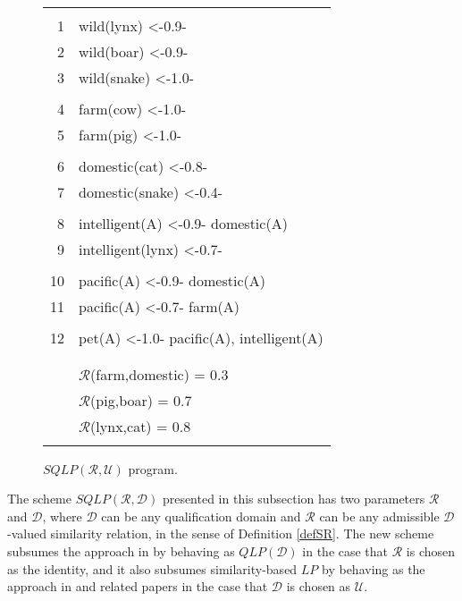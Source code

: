 \documentclass{sigplanconf}
\newcommand{\qdom}{\mathcal{D}} \newcommand{\dqdom}{D \setminus \{\bot\}} \newcommand{\bqdom}{(D \setminus \{\bot\}) \uplus \{?\}}
\newcommand{\U}{\mathcal{U}}
\newcommand{\simrel}{\mathcal{R}}
\newcommand{\qlp}[1]{QLP({#1})} \newcommand{\slp}[2]{SLP({#1,#2})} \newcommand{\sqlp}[2]{SQLP({#1,#2})} \newcommand{\bqlp}[1]{BQLP({#1})} \newcommand{\clp}[1]{CLP({#1})}
\theoremstyle{definition}
\theoremstyle{plain}
\begin{document}
\begin{figure}
\begin{center}
\tt
\begin{tabular}{|r@{\hspace{0.2cm}}l|}
\hline
&\\
\scriptsize 1 & wild(lynx) <-0.9- \\
\scriptsize 2 & wild(boar) <-0.9- \\
\scriptsize 3 & wild(snake) <-1.0- \\
&\\
\scriptsize 4 & farm(cow) <-1.0- \\
\scriptsize 5 & farm(pig) <-1.0- \\
&\\
\scriptsize 6 & domestic(cat) <-0.8- \\
\scriptsize 7 & domestic(snake) <-0.4- \\
&\\
\scriptsize 8 & intelligent(A) <-0.9- domestic(A) \\
\scriptsize 9 & intelligent(lynx) <-0.7- \\
&\\
\scriptsize 10 & pacific(A) <-0.9- domestic(A) \\
\scriptsize 11 & pacific(A) <-0.7- farm(A) \\
&\\
\scriptsize 12 & pet(A) <-1.0- pacific(A), intelligent(A) \\
&\\
\hline
&\\
&$\simrel$(farm,domestic) = 0.3 \\
&$\simrel$(pig,boar) = 0.7 \\
&$\simrel$(lynx,cat) = 0.8 \\
&\\
\hline
\end{tabular}
\end{center}
\caption{$\sqlp{\simrel}{\U}$ program.\label{fig:example}}
\end{figure}

The scheme $\sqlp{\simrel}{\qdom}$ presented in this subsection has two parameters $\simrel$ and $\qdom$, where $\qdom$ can be any qualification domain and $\simrel$ can be any admissible $\qdom$-valued similarity relation, in the sense of Definition \ref{defSR}. The new scheme subsumes the approach in \cite{RR08} by behaving as $\qlp{\qdom}$ in the case that $\simrel$  is chosen as the identity, and it also subsumes similarity-based $LP$ by behaving as the approach in \cite{Ses02} and related papers in  the case that $\qdom$ is chosen as $\U$.
\end{document}
